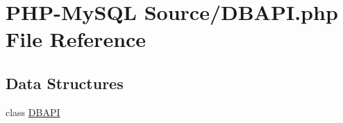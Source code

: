\hypertarget{_d_b_a_p_i_8php}{}\section{P\+H\+P-\/\+My\+S\+QL Source/\+D\+B\+A\+PI.php File Reference}
\label{_d_b_a_p_i_8php}
\subsection*{Data Structures}
\begin{DoxyCompactItemize}
\item 
class \hyperlink{class_d_b_a_p_i}{D\+B\+A\+PI}
\end{DoxyCompactItemize}
